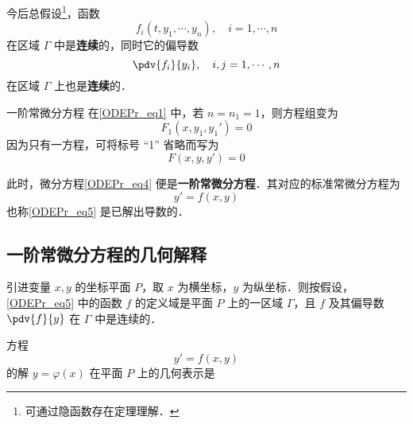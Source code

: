 今后总假设\footnote{可通过隐函数存在定理理解．}，函数 
\begin{equation}
f_i(t,y_1,\cdots,y_n),\quad i=1,\cdots,n
\end{equation}
在区域 $\Gamma$ 中是\textbf{连续}的，同时它的偏导数
\begin{equation}
\pdv{f_i}{y_i},\quad i,j=1,\cdots,n
\end{equation}
在区域 $\Gamma$ 上也是\textbf{连续}的．
\begin{example}{一阶常微分方程}
在\autoref{ODEPr_eq1} 中，若 $n=n_1=1$，则方程组变为
\begin{equation}\label{ODEPr_eq3}
F_1(x,y_1,y_1')=0
\end{equation}
因为只有一方程，可将标号 “1” 省略而写为
\begin{equation}\label{ODEPr_eq4}
F(x,y,y')=0
\end{equation}

此时，微分方程\autoref{ODEPr_eq4} 便是\textbf{一阶常微分方程}．其对应的标准常微分方程为
\begin{equation}\label{ODEPr_eq5}
y'=f(x,y)
\end{equation}
也称\autoref{ODEPr_eq5} 是已解出导数的．
\end{example}
\subsection{一阶常微分方程的几何解释}
引进变量 $x,y$ 的坐标平面 $P$，取 $x$ 为横坐标，$y$ 为纵坐标．则按假设，\autoref{ODEPr_eq5} 中的函数 $f$ 的定义域是平面 $P$ 上的一区域 $\Gamma$，且 $f$ 及其偏导数 $\pdv{f}{y}$ 在 $\Gamma$ 中是连续的．

方程
\begin{equation}
y'=f(x,y)
\end{equation}
的解 $y=\varphi(x)$ 在平面 $P$ 上的几何表示是